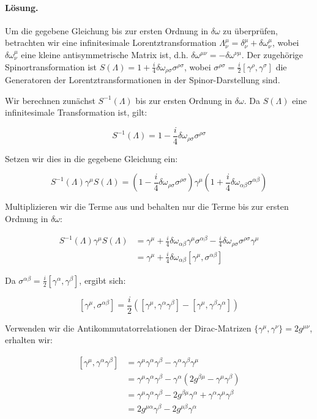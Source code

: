 \documentclass[11pt,a4paper]{article}
\begin{document}
\paragraph{Lösung.}
Um die gegebene Gleichung bis zur ersten Ordnung in $\delta \omega$ zu überprüfen, betrachten wir eine infinitesimale Lorentztransformation $\Lambda^\mu_\nu = \delta^\mu_\nu + \delta \omega^\mu_\nu$, wobei $\delta \omega^\mu_\nu$ eine kleine antisymmetrische Matrix ist, d.h. $\delta \omega^{\mu\nu} = -\delta \omega^{\nu\mu}$. Der zugehörige Spinortransformation ist $S(\Lambda) = 1 + \frac{i}{4} \delta \omega_{\rho\sigma} \sigma^{\rho\sigma}$, wobei $\sigma^{\rho\sigma} = \frac{i}{2} [\gamma^\rho, \gamma^\sigma]$ die Generatoren der Lorentztransformationen in der Spinor-Darstellung sind.

Wir berechnen zunächst $S^{-1}(\Lambda)$ bis zur ersten Ordnung in $\delta \omega$. Da $S(\Lambda)$ eine infinitesimale Transformation ist, gilt:

\[
S^{-1}(\Lambda) = 1 - \frac{i}{4} \delta \omega_{\rho\sigma} \sigma^{\rho\sigma}
\]

Setzen wir dies in die gegebene Gleichung ein:

\[
S^{-1}(\Lambda) \gamma^\mu S(\Lambda) = \left(1 - \frac{i}{4} \delta \omega_{\rho\sigma} \sigma^{\rho\sigma}\right) \gamma^\mu \left(1 + \frac{i}{4} \delta \omega_{\alpha\beta} \sigma^{\alpha\beta}\right)
\]

Multiplizieren wir die Terme aus und behalten nur die Terme bis zur ersten Ordnung in $\delta \omega$:

\[
\begin{align*}
S^{-1}(\Lambda) \gamma^\mu S(\Lambda) &= \gamma^\mu + \frac{i}{4} \delta \omega_{\alpha\beta} \gamma^\mu \sigma^{\alpha\beta} - \frac{i}{4} \delta \omega_{\rho\sigma} \sigma^{\rho\sigma} \gamma^\mu \\
&= \gamma^\mu + \frac{i}{4} \delta \omega_{\alpha\beta} [\gamma^\mu, \sigma^{\alpha\beta}]
\end{align*}
\]

Da $\sigma^{\alpha\beta} = \frac{i}{2} [\gamma^\alpha, \gamma^\beta]$, ergibt sich:

\[
[\gamma^\mu, \sigma^{\alpha\beta}] = \frac{i}{2} \left( [\gamma^\mu, \gamma^\alpha \gamma^\beta] - [\gamma^\mu, \gamma^\beta \gamma^\alpha] \right)
\]

Verwenden wir die Antikommutatorrelationen der Dirac-Matrizen $\{\gamma^\mu, \gamma^\nu\} = 2g^{\mu\nu}$, erhalten wir:

\[
\begin{align*}
[\gamma^\mu, \gamma^\alpha \gamma^\beta] &= \gamma^\mu \gamma^\alpha \gamma^\beta - \gamma^\alpha \gamma^\beta \gamma^\mu \\
&= \gamma^\mu \gamma^\alpha \gamma^\beta - \gamma^\alpha (2g^{\beta\mu} - \gamma^\mu \gamma^\beta) \\
&= \gamma^\mu \gamma^\alpha \gamma^\beta - 2g^{\beta\mu} \gamma^\alpha + \gamma^\alpha \gamma^\mu \gamma^\beta \\
&= 2g^{\mu\alpha} \gamma^\beta - 2g^{\mu\beta} \gamma^\alpha
\end{align*}
\]
\end{document}
